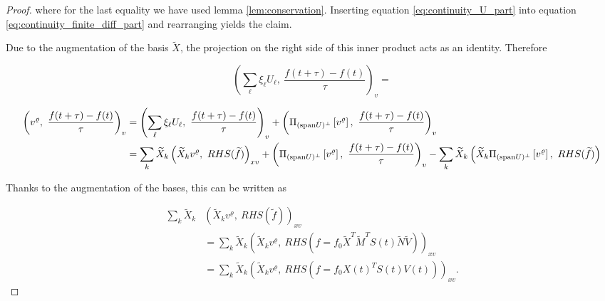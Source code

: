 \begin{proof}
    where for the last equality we have used lemma \ref{lem:conservation}. Inserting 
    equation \ref{eq:continuity_U_part} into equation \ref{eq:continuity_finite_diff_part} 
    and rearranging yields the claim. 

    \iffalse
    Due to the augmentation of the basis $\widetilde{ X }$, the projection on the right side 
    of this inner product acts as an identity. Therefore 

    \begin{equation}
        \left( \sum_\ell \xi_\ell U_\ell,\ \frac{f(t + \tau) - f(t)}{\tau} \right)_v
        = 
    \end{equation}

    \begin{equation}
        \begin{split}
            \left( v^\varrho,\ \frac{f(t + \tau) - f(t)}{\tau} \right)_v
            &= \left( \sum_\ell \xi_\ell U_\ell,\ \frac{f(t + \tau) - f(t)}{\tau} \right)_v
                + \left( \Pi_{(\spn U)^\perp} \left[ v^\varrho \right],\ 
                \frac{f(t + \tau) - f(t)}{\tau} \right)_v \\ 
            &= \sum_k \widetilde{ X }_k 
            \left( \widetilde{ X }_k v^\varrho,\ RHS (\widetilde{ f }) \right)_{x v}
            + \left( \Pi_{(\spn U)^\perp} \left[ v^\varrho \right],\ 
                \frac{f(t + \tau) - f(t)}{\tau} \right)_v
            - \sum_k \widetilde{ X }_k \left( \widetilde{ X }_k \Pi_{(\spn U)^\perp} \left[ v^\varrho \right],\ 
            RHS( \widetilde{ f } ) \right)
        \end{split}
    \end{equation}

    Thanks to the augmentation of the bases, this can be written as 

    \begin{equation}\label{eq:varPsi}
        \begin{split}
            \sum_k \widetilde{ X }_k &
                \left( \widetilde{ X }_k v^\varrho,\ RHS (\widetilde{ f }) \right)_{x v} \\
            &= \sum_k \widetilde{ X }_k 
            \left( \widetilde{ X }_k v^\varrho,\ 
                RHS (
                    f = f_0 
                        \widetilde{ X }^T 
                        \widetilde{ M }^T 
                        S (t) 
                        \widetilde{ N }
                        \widetilde{ V }
                ) 
            \right)_{x v} \\
            &= \sum_k \widetilde{ X }_k 
            \left( \widetilde{ X }_k v^\varrho,\ 
                RHS ( f = f_0 X(t)^T S (t) V(t) ) \right)_{x v} . 
        \end{split}
    \end{equation}


\end{proof}
